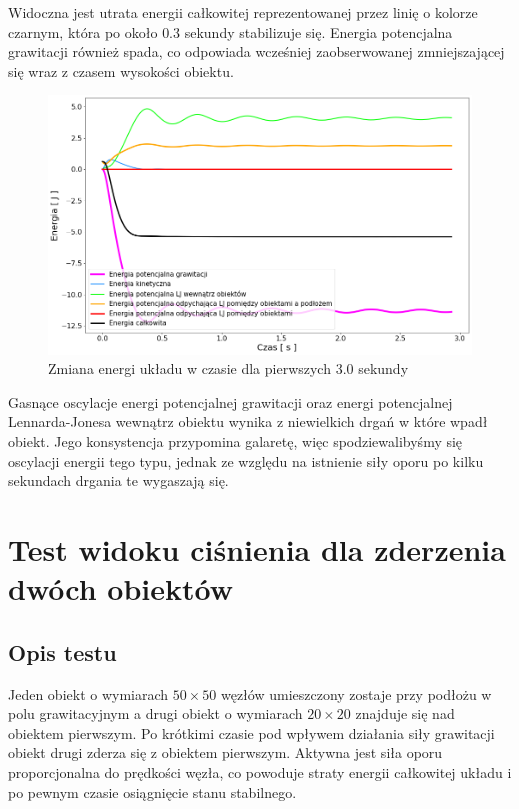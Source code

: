 \documentclass[12pt, letterpaper]{report}
\begin{document}
    Widoczna jest utrata energii całkowitej reprezentowanej przez linię o kolorze czarnym, która po około $0.3$ sekundy
    stabilizuje się. Energia potencjalna grawitacji również spada, co odpowiada wcześniej zaobserwowanej 
    zmniejszającej się wraz z czasem wysokości obiektu.

    \begin{figure}[H]
        \centering
        \includegraphics[width=14cm]{pressure_energy_02.png}
        \caption{
            Zmiana energi układu w czasie dla pierwszych 3.0 sekundy
        }
    \end{figure}

    Gasnące oscylacje energi potencjalnej grawitacji oraz energi potencjalnej Lennarda-Jonesa wewnątrz obiektu
    wynika z niewielkich drgań w które wpadł obiekt. Jego konsystencja przypomina galaretę, więc spodziewalibyśmy się
    oscylacji energii tego typu, jednak ze względu na istnienie siły oporu po kilku sekundach drgania te wygaszają się.


    \newpage
    \section{Test widoku ciśnienia dla zderzenia dwóch obiektów}
    \subsection{Opis testu}
    Jeden obiekt o wymiarach $50 \times 50$ węzłów umieszczony zostaje przy podłożu w polu grawitacyjnym a
    drugi obiekt o wymiarach $20 \times 20$ znajduje się nad obiektem pierwszym. Po krótkimi czasie pod wpływem
    działania siły grawitacji obiekt drugi zderza się z obiektem pierwszym. Aktywna jest siła oporu 
    proporcjonalna do prędkości węzła, co powoduje straty energii całkowitej układu i po pewnym czasie osiągnięcie
    stanu stabilnego.
\end{document}
